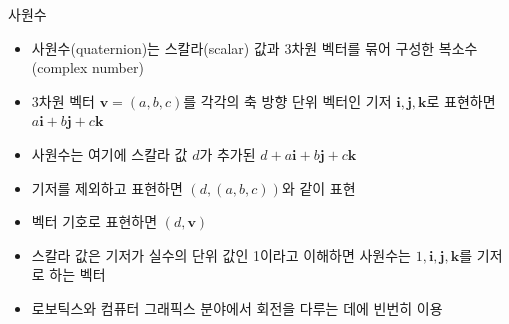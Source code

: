 \begin{frame}[fragile]{사원수}

\begin{itemize}
\item 사원수(quaternion)는 스칼라(scalar) 값과 3차원 벡터를 묶어 구성한 복소수(complex number)
\item 3차원 벡터 $\mathbf v = (a, b, c)$를 각각의 축 방향 단위 벡터인 기저 $\mathbf i, \mathbf  j, \mathbf k$로 표현하면 $a{\mathbf i} + b {\mathbf j} + c {\mathbf k}$
\item 사원수는 여기에 스칼라 값 $d$가 추가된 $d + a{\mathbf i} + b {\mathbf j} + c {\mathbf k}$
\item 기저를 제외하고 표현하면 $(d, (a, b, c))$와 같이 표현 
\item 벡터 기호로 표현하면 $(d, \mathbf v)$
\item 스칼라 값은 기저가 실수의 단위 값인 1이라고 이해하면 사원수는 $1, \mathbf i, \mathbf  j, \mathbf k$를 기저로 하는 벡터
\item 로보틱스와 컴퓨터 그래픽스 분야에서 회전을 다루는 데에 빈번히 이용
\end{itemize}

\end{frame}

